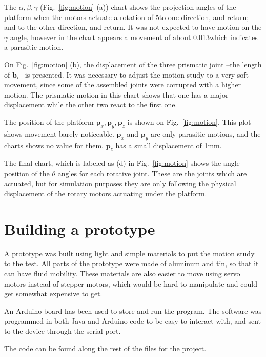 \documentclass[titlepage, letterpaper]{article}
\begin{document}
The $\alpha, \beta, \gamma$ (Fig.~\ref{fig:motion} (a)) chart shows the projection angles of the platform when the motors actuate a rotation of 5\textdegree to one direction, and return; and to the other direction, and return.
It was not expected to have motion on the $\gamma$ angle, however in the chart appears a movement of about 0.013\textdegree which indicates a parasitic motion.

On Fig.~\ref{fig:motion} (b), the displacement of the three prismatic joint –the length of $\textbf{b}_i$– is presented.
It was necessary to adjust the motion study to a very soft movement, since some of the assembled joints were corrupted with a higher motion.
The prismatic motion in this chart shows that one has a major displacement while the other two react to the first one.

The position of the platform $\mathbf{p}_x, \mathbf{p}_y, \mathbf{p}_z$ is shown on Fig.~\ref{fig:motion}.
This plot shows movement barely noticeable.
$\mathbf{p}_x$ and $\mathbf{p}_y$ are only parasitic motions, and the charts shows no value for them.
$\mathbf{p}_z$ has a small displacement of 1mm.

The final chart, which is labeled as (d) in Fig.~\ref{fig:motion} shows the angle position of the $\theta$ angles for each rotative joint.
These are the joints which are actuated, but for simulation purposes they are only following the physical displacement of the rotary motors actuating under the platform.

\section{Building a prototype}
\label{sec:prototype}

A prototype was built using light and simple materials to put the motion study to the test.
All parts of the prototype were made of aluminum and tin, so that it can have fluid mobility.
These materials are also easier to move using servo motors instead of stepper motors, which would be hard to manipulate and could get somewhat expensive to get.

An Arduino board has been used to store and run the program.
The software was programmed in both Java and Arduino code to be easy to interact with, and sent to the device through the serial port.

The code can be found along the rest of the files for the project.
\end{document}

